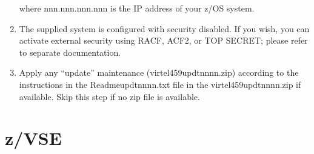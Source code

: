 \documentclass[letterpaper,10pt,english]{sphinxmanual}
\begin{document}
\begin{enumerate}
where nnn.nnn.nnn.nnn is the IP address of your z/OS system.

\item {} 
The supplied system is configured with security disabled. If you wish, you can activate external security using RACF, ACF2, or TOP SECRET; please refer to separate documentation.

\item {} 
Apply any “update” maintenance (virtel459updtnnnn.zip) according to the instructions in the Readme\sphinxhyphen{}updtnnnn.txt file in the virtel459updtnnnn.zip if available. Skip this step if no zip file is available.

\end{enumerate}


\section{z/VSE}
\end{document}
